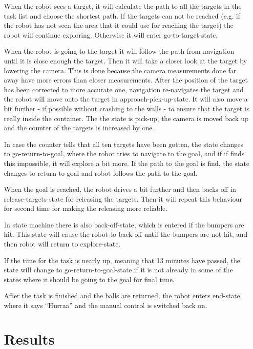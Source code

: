 \documentclass[a4paper,10pt]{article}
\begin{document}
When the robot sees a target, it will calculate the path to all the targets in the task list and choose the shortest path. If the targets can not be reached (e.g. if the robot has not seen the area that it could use for reaching the target) the robot will continue exploring. Otherwise it will enter go-to-target-state.

When the robot is going to the target it will follow the path from navigation until it is close enough the target. Then it will take a closer look at the target by lowering the camera. This is done because the camera measurements done far away have more errors than closer measurements. After the position of the target has been corrected to more accurate one, navigation re-navigates the target and the robot will move onto the target in approach-pick-up-state. It will also move a bit further - if possible without crashing to the walls - to ensure that the target is really inside the container. The the state is pick-up, the camera is moved back up and the counter of the targets is increased by one.

In case the counter tells that all ten targets have been gotten, the state changes to go-return-to-goal, where the robot tries to navigate to the goal, and if if finds this impossible, it will explore a bit more. If the path to the goal is find, the state changes to return-to-goal and robot follows the path to the goal.

When the goal is reached, the robot drives a bit further and then backs off in release-targets-state for releasing the targets. Then it will repeat this behaviour for second time for making the releasing more reliable.

In state machine there is also back-off-state, which is entered if the bumpers are hit. This state will cause the robot to back off until the bumpers are not hit, and then robot will return to explore-state.

If the time for the task is nearly up, meaning that 13 minutes have passed, the state will change to go-return-to-goal-state if it is not already in some of the states where it should be going to the goal for final time.

After the task is finished and the balls are returned, the robot enters end-state, where it says “Hurraa” and the manual control is switched back on.

\section{Results}
\end{document}
